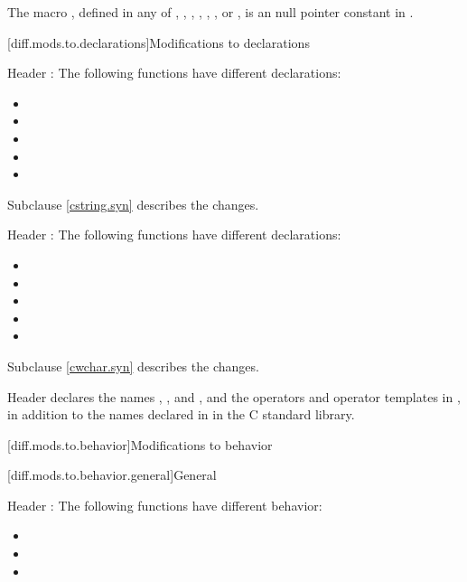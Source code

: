 \pnum
The macro
,
defined in any of
,
,
,
,
,
,
or ,
is an  null pointer constant in
\Cpp{}.

[diff.mods.to.declarations]{Modifications to declarations}

\pnum
Header :
The following functions have different declarations:

\begin{itemize}
\item {}
\item {}
\item {}
\item {}
\item {}
\end{itemize}

Subclause \ref{cstring.syn} describes the changes.

\pnum
Header :
The following functions have different declarations:

\begin{itemize}
\item {}
\item {}
\item {}
\item {}
\item {}
\end{itemize}

Subclause \ref{cwchar.syn} describes the changes.

\pnum
Header 
declares the names , , and ,
and the operators and operator templates in ,
in addition to the names declared in
 in the C standard library.

[diff.mods.to.behavior]{Modifications to behavior}

[diff.mods.to.behavior.general]{General}

\pnum
Header :
The following functions have different behavior:

\begin{itemize}
\item {}
\item {}
\item {}
\end{itemize}

